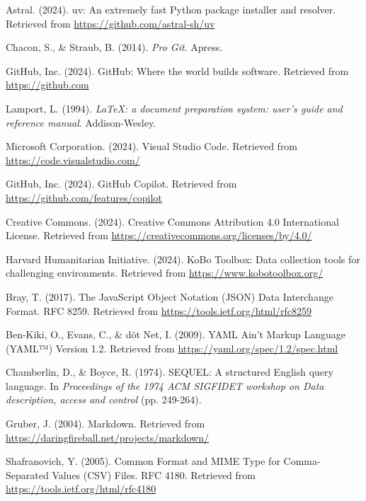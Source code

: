 \documentclass{article}
\begin{document}
\begin{thebibliography}{99}
Astral. (2024). uv: An extremely fast Python package installer and resolver. Retrieved from \url{https://github.com/astral-sh/uv}

Chacon, S., \& Straub, B. (2014). \textit{Pro Git}. Apress.

GitHub, Inc. (2024). GitHub: Where the world builds software. Retrieved from \url{https://github.com}

Lamport, L. (1994). \textit{LaTeX: a document preparation system: user's guide and reference manual}. Addison-Wesley.

Microsoft Corporation. (2024). Visual Studio Code. Retrieved from \url{https://code.visualstudio.com/}

GitHub, Inc. (2024). GitHub Copilot. Retrieved from \url{https://github.com/features/copilot}

Creative Commons. (2024). Creative Commons Attribution 4.0 International License. Retrieved from \url{https://creativecommons.org/licenses/by/4.0/}

Harvard Humanitarian Initiative. (2024). KoBo Toolbox: Data collection tools for challenging environments. Retrieved from \url{https://www.kobotoolbox.org/}

Bray, T. (2017). The JavaScript Object Notation (JSON) Data Interchange Format. RFC 8259. Retrieved from \url{https://tools.ietf.org/html/rfc8259}

Ben-Kiki, O., Evans, C., \& döt Net, I. (2009). YAML Ain't Markup Language (YAML™) Version 1.2. Retrieved from \url{https://yaml.org/spec/1.2/spec.html}

Chamberlin, D., \& Boyce, R. (1974). SEQUEL: A structured English query language. In \textit{Proceedings of the 1974 ACM SIGFIDET workshop on Data description, access and control} (pp. 249-264).

Gruber, J. (2004). Markdown. Retrieved from \url{https://daringfireball.net/projects/markdown/}

Shafranovich, Y. (2005). Common Format and MIME Type for Comma-Separated Values (CSV) Files. RFC 4180. Retrieved from \url{https://tools.ietf.org/html/rfc4180}

\end{thebibliography}
\end{document}

